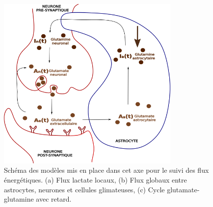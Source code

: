\documentclass[a4paper, 12pt, twoside, openright]{article}
\begin{document}
\begin{itemize}
\begin{itemize}
\begin{figure}[!htbp]
\begin{minipage}{0.3\textwidth}
\includegraphics[width=0.8\textwidth]{dessin3.png}
\end{minipage}
\caption{Schéma des modèles mis en place dans cet axe pour le suivi des flux énergétiques. (a) Flux lactate locaux, (b) Flux globaux entre astrocytes, neurones et cellules glimateuses, (c) Cycle glutamate-glutamine avec retard. }\label{Lac}
\end{figure}


\end{itemize}
\end{itemize}
\end{document}
